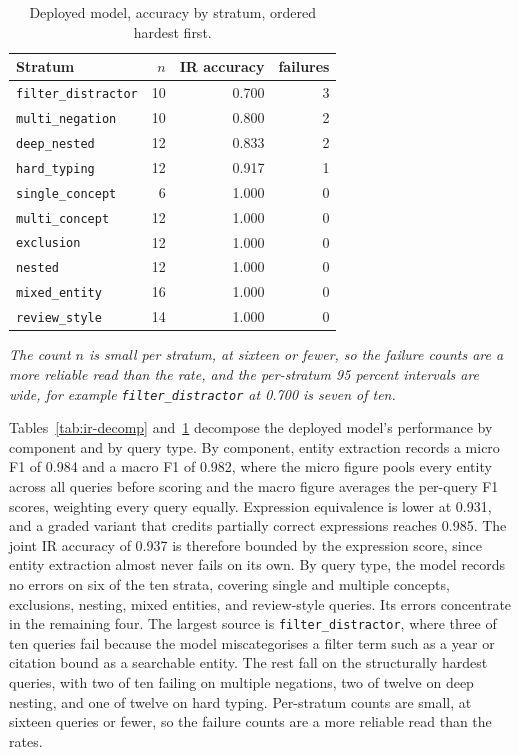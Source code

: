 \begin{table}[t]
\caption{Deployed model, accuracy by stratum, ordered hardest first.}
\label{tab:ir-stratum}
\centering
\footnotesize
\begin{tabular}{@{}lrrr@{}}
\toprule
Stratum & $n$ & IR accuracy & failures \\
\midrule
\texttt{filter\_distractor} & 10 & 0.700 & 3 \\
\texttt{multi\_negation} & 10 & 0.800 & 2 \\
\texttt{deep\_nested} & 12 & 0.833 & 2 \\
\texttt{hard\_typing} & 12 & 0.917 & 1 \\
\texttt{single\_concept} & 6 & 1.000 & 0 \\
\texttt{multi\_concept} & 12 & 1.000 & 0 \\
\texttt{exclusion} & 12 & 1.000 & 0 \\
\texttt{nested} & 12 & 1.000 & 0 \\
\texttt{mixed\_entity} & 16 & 1.000 & 0 \\
\texttt{review\_style} & 14 & 1.000 & 0 \\
\bottomrule
\end{tabular}

\vspace{3pt}
\begin{minipage}{\linewidth}
\footnotesize\itshape
The count $n$ is small per stratum, at sixteen or fewer, so the failure counts are a more reliable read than the rate, and the per-stratum 95 percent intervals are wide, for example \texttt{filter\_distractor} at 0.700 is seven of ten.
\end{minipage}
\end{table}

Tables~\ref{tab:ir-decomp} and~\ref{tab:ir-stratum} decompose the deployed model's performance by component and by query type. By component, entity extraction records a micro F1 of 0.984 and a macro F1 of 0.982, where the micro figure pools every entity across all queries before scoring and the macro figure averages the per-query F1 scores, weighting every query equally. Expression equivalence is lower at 0.931, and a graded variant that credits partially correct expressions reaches 0.985. The joint IR accuracy of 0.937 is therefore bounded by the expression score, since entity extraction almost never fails on its own. By query type, the model records no errors on six of the ten strata, covering single and multiple concepts, exclusions, nesting, mixed entities, and review-style queries. Its errors concentrate in the remaining four. The largest source is \texttt{filter\_distractor}, where three of ten queries fail because the model miscategorises a filter term such as a year or citation bound as a searchable entity. The rest fall on the structurally hardest queries, with two of ten failing on multiple negations, two of twelve on deep nesting, and one of twelve on hard typing. Per-stratum counts are small, at sixteen queries or fewer, so the failure counts are a more reliable read than the rates.


